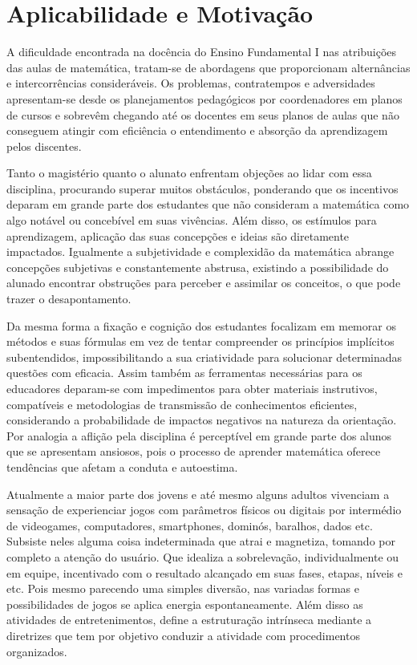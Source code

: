 \section{Aplicabilidade e Motivação}\label{chp:aplic}

A dificuldade encontrada na docência do Ensino Fundamental I nas atribuições das aulas de matemática, tratam-se de abordagens que proporcionam alternâncias e intercorrências consideráveis. Os problemas, contratempos e adversidades apresentam-se desde os planejamentos pedagógicos por coordenadores em planos de cursos e sobrevêm chegando até os docentes em seus planos de aulas que não conseguem atingir com eficiência o entendimento e absorção da aprendizagem pelos discentes. 

Tanto o magistério quanto o alunato enfrentam objeções ao lidar com essa disciplina, procurando superar muitos obstáculos, ponderando que os incentivos deparam em grande parte dos estudantes que não consideram a matemática como algo notável ou concebível em suas vivências. Além disso, os estímulos para aprendizagem, aplicação das suas concepções e ideias são diretamente impactados. Igualmente a subjetividade e complexidão da matemática abrange concepções subjetivas e constantemente abstrusa, existindo a possibilidade do alunado encontrar obstruções para perceber e assimilar os conceitos, o que pode trazer o desapontamento. 

Da mesma forma a fixação e cognição dos estudantes focalizam em memorar os métodos e suas fórmulas em vez de tentar compreender os princípios implícitos subentendidos, impossibilitando a sua criatividade para solucionar determinadas questões com eficacia. Assim também as ferramentas necessárias para os educadores deparam-se com impedimentos para obter materiais instrutivos, compatíveis e metodologias de transmissão de conhecimentos eficientes, considerando a probabilidade de impactos negativos na natureza da orientação. Por analogia a aflição pela disciplina é perceptível em grande parte dos alunos que se apresentam ansiosos, pois o processo de aprender matemática oferece tendências que afetam a conduta e autoestima. 

Atualmente a maior parte dos jovens e até mesmo alguns adultos vivenciam a sensação de experienciar jogos com parâmetros físicos ou digitais por intermédio de videogames, computadores, smartphones, dominós, baralhos, dados etc. Subsiste neles alguma coisa indeterminada que atrai e magnetiza, tomando por completo a atenção do usuário. Que idealiza a sobrelevação, individualmente ou em equipe, incentivado com o resultado alcançado em suas fases, etapas, níveis e etc. Pois mesmo parecendo uma simples diversão, nas variadas formas e possibilidades de jogos se aplica energia espontaneamente. Além disso as atividades de entretenimentos, define a estruturação intrínseca mediante a diretrizes que tem por objetivo conduzir a atividade com procedimentos organizados.

